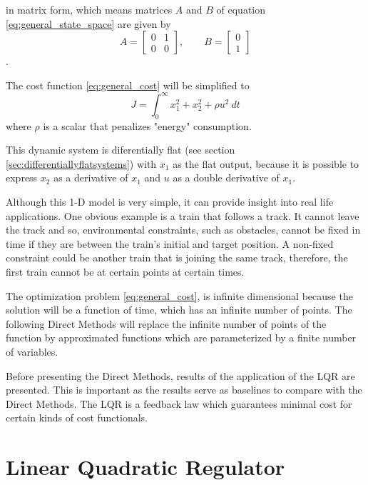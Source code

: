 in matrix form, which means matrices $A$ and $B$ of equation \ref{eq:general_state_space} are given by
\begin{equation}
    A = \begin{bmatrix} 0 & 1 \\ 0 & 0 \end{bmatrix}, \qquad B = \begin{bmatrix} 0 \\ 1 \end{bmatrix}
    \label{eq:A_and_B}
\end{equation}.

\par The cost function \ref{eq:general_cost} will be simplified to
\begin{equation}
    J = \int_0^\infty x_1^2 + x_2^2 + \rho u^2\  dt
    \label{eq:my_cost}
\end{equation}
where $\rho$ is a scalar that penalizes "energy" consumption.
\par This dynamic system is diferentially flat (see section \ref{sec:differentiallyflatsystems}) with $x_1$ as the flat output, because it is possible to express $x_2$ as a derivative of $x_1$ and $u$ as a double derivative of $x_1$.
\par Although this 1-D model is very simple, it can provide insight into real life applications. One obvious example is a train that follows a track. It cannot leave the track and so, environmental constraints, such as obstacles, cannot be fixed in time if they are between the train's initial and target position. A non-fixed constraint could be another train that is joining the same track, therefore, the first train cannot be at certain points at certain times.
\par The optimization problem \eqref{eq:general_cost}, is infinite dimensional because the solution will be a function of time, which has an infinite number of points. The following Direct Methods will replace the infinite number of points of the function by approximated functions which are parameterized by a finite number of variables.
\par Before presenting the Direct Methods, results of the application of the \acl{LQR} are presented. This is important as the results serve as baselines to compare with the Direct Methods. The \ac{LQR} is a feedback law which guarantees minimal cost for certain kinds of cost functionals.

\section{Linear Quadratic Regulator}
\label{sec:linearquadraticregulator}

